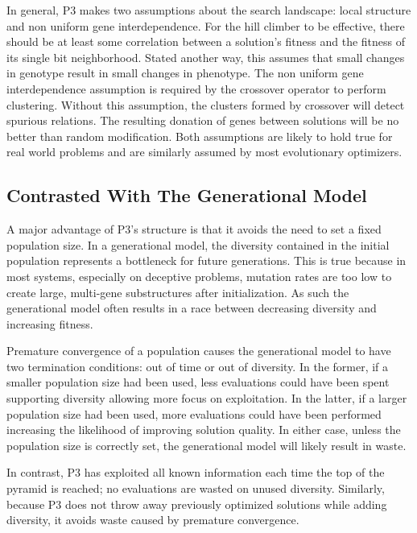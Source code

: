 \documentclass{sig-alternate}
\begin{document}
In general, P3 makes two assumptions about the search landscape:
local structure and non uniform gene interdependence.
For the hill climber to be effective, there should be at least some
correlation between a solution's fitness and the fitness of its single
bit neighborhood. Stated another way, this assumes that small changes
in genotype result in small changes in phenotype. The non uniform gene
interdependence assumption is required by the crossover operator to
perform clustering.  Without this assumption, the clusters formed by
crossover will detect spurious relations. The resulting donation of genes
between solutions will be no better than random modification.  Both
assumptions are likely to hold true for real world problems and are similarly
assumed by most evolutionary optimizers.

\subsection{Contrasted With The Generational Model}
A major advantage of P3's structure is that it avoids the need to set
a fixed population size.  In a generational model, the diversity
contained in the initial population represents a bottleneck for future
generations.  This is true because in most systems, especially on
deceptive problems, mutation rates are too low
to create large, multi-gene substructures after
initialization.  As such the generational model often results in a
race between decreasing diversity and increasing fitness. 

Premature convergence of a population causes the generational model
to have two termination conditions: out of time or out of
diversity.  In the former, if a smaller population size had been used,
less evaluations could have been spent supporting diversity allowing more
focus on exploitation.
In the latter, if a larger population size had been
used, more evaluations could have been performed increasing the
likelihood of improving solution quality.  In
either case, unless the population size is correctly set, the
generational model will likely result in waste.

In contrast, P3 has exploited all known information each time the top of the pyramid is reached;
no evaluations are wasted  on unused diversity.  Similarly, because P3
does not throw away previously optimized solutions while adding diversity, it avoids
waste caused by premature convergence.
\end{document}
